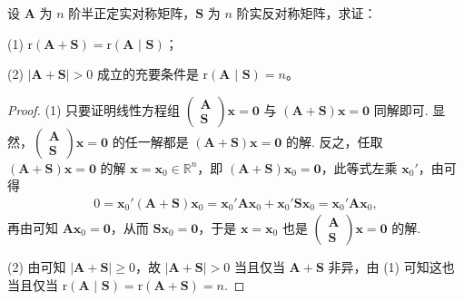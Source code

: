 \documentclass[../../main.tex]{subfiles}
\begin{document}
\begin{proposition}\label{proposition:半正定与实反称阵关于秩的性质}
设 $\boldsymbol{A}$ 为 $n$ 阶半正定实对称矩阵，$\boldsymbol{S}$ 为 $n$ 阶实反对称矩阵，求证：

(1) $\mathrm{r}\left( \boldsymbol{A}+\boldsymbol{S} \right) =\mathrm{r}\left( \boldsymbol{A}\,\,|\,\,\boldsymbol{S} \right) $；

(2) $|\boldsymbol{A}+\boldsymbol{S}|>0$ 成立的充要条件是 $\mathrm{r}\left( \boldsymbol{A}\,\,|\,\,\boldsymbol{S} \right)=n$。
\end{proposition}
\begin{proof}
(1) 只要证明线性方程组 $\begin{pmatrix}
\boldsymbol{A} \\
\boldsymbol{S}
\end{pmatrix}\boldsymbol{x}=\boldsymbol{0}$ 与 $(\boldsymbol{A}+\boldsymbol{S})\boldsymbol{x}=\boldsymbol{0}$ 同解即可. 显然，$\begin{pmatrix}
\boldsymbol{A} \\
\boldsymbol{S}
\end{pmatrix}\boldsymbol{x}=\boldsymbol{0}$ 的任一解都是 $(\boldsymbol{A}+\boldsymbol{S})\boldsymbol{x}=\boldsymbol{0}$ 的解. 反之，任取 $(\boldsymbol{A}+\boldsymbol{S})\boldsymbol{x}=\boldsymbol{0}$ 的解 $\boldsymbol{x}=\boldsymbol{x}_0\in\mathbb{R}^n$，即 $(\boldsymbol{A}+\boldsymbol{S})\boldsymbol{x}_0=\boldsymbol{0}$，此等式左乘 $\boldsymbol{x}_0'$，由可得
\begin{align*}
0=\boldsymbol{x}_0'(\boldsymbol{A}+\boldsymbol{S})\boldsymbol{x}_0=\boldsymbol{x}_0'\boldsymbol{A}\boldsymbol{x}_0+\boldsymbol{x}_0'\boldsymbol{S}\boldsymbol{x}_0=\boldsymbol{x}_0'\boldsymbol{A}\boldsymbol{x}_0,
\end{align*}
再由可知 $\boldsymbol{A}\boldsymbol{x}_0=\boldsymbol{0}$，从而 $\boldsymbol{S}\boldsymbol{x}_0=\boldsymbol{0}$，于是 $\boldsymbol{x}=\boldsymbol{x}_0$ 也是 $\begin{pmatrix}
\boldsymbol{A} \\
\boldsymbol{S}
\end{pmatrix}\boldsymbol{x}=\boldsymbol{0}$ 的解.

(2) 由可知 $|\boldsymbol{A}+\boldsymbol{S}|\geq0$，故 $|\boldsymbol{A}+\boldsymbol{S}|>0$ 当且仅当 $\boldsymbol{A}+\boldsymbol{S}$ 非异，由 (1) 可知这也当且仅当 $\mathrm{r}\left( \boldsymbol{A}\,\,|\,\,\boldsymbol{S} \right) =\mathrm{r}(\boldsymbol{A}+\boldsymbol{S})=n$.
\end{proof}
\end{document}
